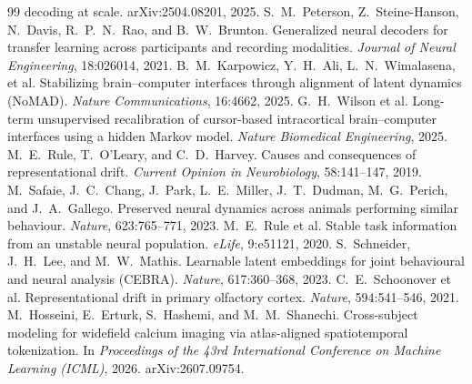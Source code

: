 \documentclass{article}
\begin{document}
{\begin{thebibliography}{99}
decoding at scale. arXiv:2504.08201, 2025.
 S.~M.~Peterson, Z.~Steine-Hanson, N.~Davis,
R.~P.~N.~Rao, and B.~W.~Brunton. Generalized neural decoders for transfer learning across
participants and recording modalities. \emph{Journal of Neural Engineering}, 18:026014, 2021.
 B.~M.~Karpowicz, Y.~H.~Ali, L.~N.~Wimalasena,
et al. Stabilizing brain--computer interfaces through alignment of latent dynamics (NoMAD).
\emph{Nature Communications}, 16:4662, 2025.
 G.~H.~Wilson et al. Long-term unsupervised recalibration
of cursor-based intracortical brain--computer interfaces using a hidden Markov model. \emph{Nature
Biomedical Engineering}, 2025.
 M.~E.~Rule, T.~O'Leary, and C.~D.~Harvey. Causes and
consequences of representational drift. \emph{Current Opinion in Neurobiology}, 58:141--147, 2019.
 M.~Safaie, J.~C.~Chang, J.~Park, L.~E.~Miller,
J.~T.~Dudman, M.~G.~Perich, and J.~A.~Gallego. Preserved neural dynamics across animals performing
similar behaviour. \emph{Nature}, 623:765--771, 2023.
 M.~E.~Rule et al. Stable task information from an unstable
neural population. \emph{eLife}, 9:e51121, 2020.
 S.~Schneider, J.~H.~Lee, and M.~W.~Mathis.
Learnable latent embeddings for joint behavioural and neural analysis (CEBRA). \emph{Nature},
617:360--368, 2023.
 C.~E.~Schoonover et al. Representational drift in
primary olfactory cortex. \emph{Nature}, 594:541--546, 2021.
 M.~Hosseini, E.~Erturk, S.~Hashemi, and M.~M.~Shanechi.
Cross-subject modeling for widefield calcium imaging via atlas-aligned spatiotemporal tokenization.
In \emph{Proceedings of the 43rd International Conference on Machine Learning (ICML)}, 2026.
arXiv:2607.09754.
\end{thebibliography}
}
\end{document}

